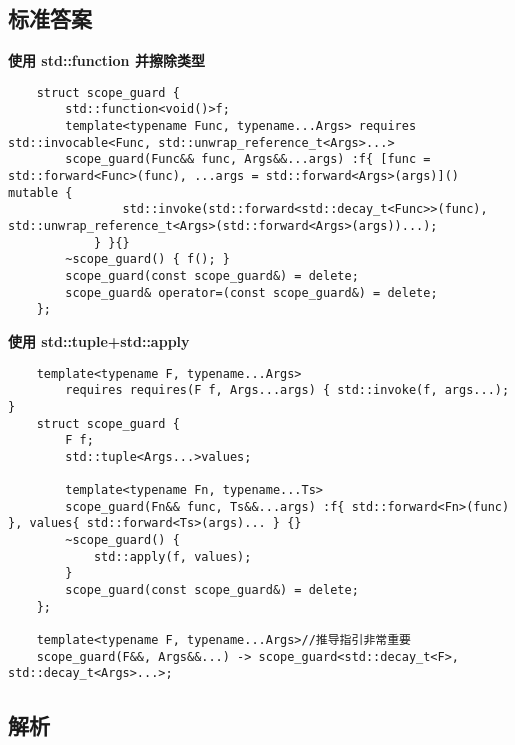 

\subsection{标准答案}

\textbf{使用 std::function 并擦除类型}

\begin{verbatim}
    struct scope_guard {
        std::function<void()>f;
        template<typename Func, typename...Args> requires std::invocable<Func, std::unwrap_reference_t<Args>...>
        scope_guard(Func&& func, Args&&...args) :f{ [func = std::forward<Func>(func), ...args = std::forward<Args>(args)]() mutable {
                std::invoke(std::forward<std::decay_t<Func>>(func), std::unwrap_reference_t<Args>(std::forward<Args>(args))...);
            } }{}
        ~scope_guard() { f(); }
        scope_guard(const scope_guard&) = delete;
        scope_guard& operator=(const scope_guard&) = delete;
    };
\end{verbatim}

\textbf{使用 std::tuple+std::apply}

\begin{verbatim}
    template<typename F, typename...Args>
        requires requires(F f, Args...args) { std::invoke(f, args...); }
    struct scope_guard {
        F f;
        std::tuple<Args...>values;

        template<typename Fn, typename...Ts>
        scope_guard(Fn&& func, Ts&&...args) :f{ std::forward<Fn>(func) }, values{ std::forward<Ts>(args)... } {}
        ~scope_guard() {
            std::apply(f, values);
        }
        scope_guard(const scope_guard&) = delete;
    };

    template<typename F, typename...Args>//推导指引非常重要
    scope_guard(F&&, Args&&...) -> scope_guard<std::decay_t<F>, std::decay_t<Args>...>;
\end{verbatim}

\subsection{解析}

\clearpage